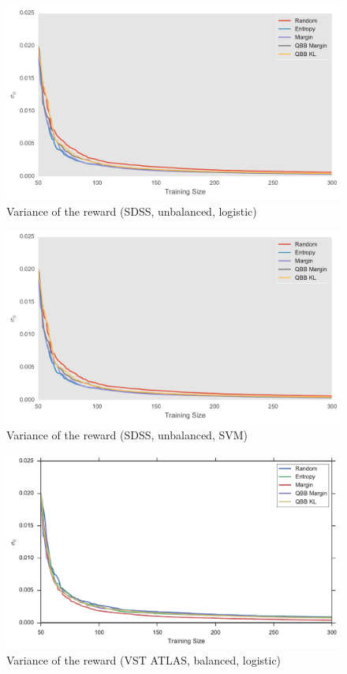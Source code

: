 \begin{figure}[p]
	\centering
	\includegraphics[width=\textwidth]{figures/5_thompson/sdss_ul_sigmas}
	\caption[Variance of the reward (SDSS, unbalanced, logistic)]{
		Variance of the reward (SDSS, unbalanced, logistic)}
	\label{fig:sdss_ul_sigmas}
\end{figure}

\begin{figure}[p]
	\centering
	\includegraphics[width=\textwidth]{figures/5_thompson/sdss_ur_sigmas}
	\caption[Variance of the reward (SDSS, unbalanced, SVM)]{
		Variance of the reward (SDSS, unbalanced, SVM)}
	\label{fig:sdss_ur_sigmas}
\end{figure}

\begin{figure}[p]
	\centering
	\includegraphics[width=\textwidth]{figures/5_thompson/vstatlas_bl_sigmas}
	\caption[Variance of the reward (VST ATLAS, balanced, logistic)]{
		Variance of the reward (VST ATLAS, balanced, logistic)}
	\label{fig:vstatlas_bl_sigmas}
\end{figure}

